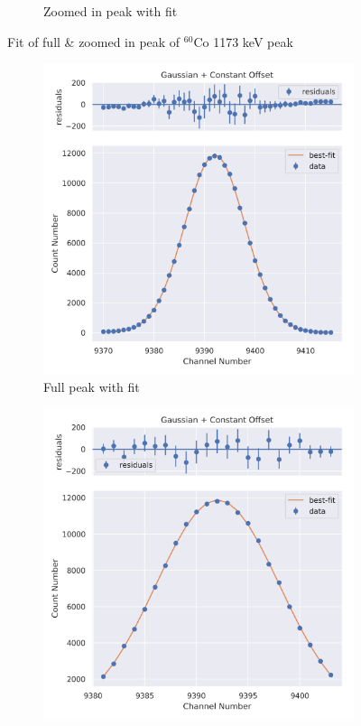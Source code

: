 \documentclass[11pt,a4paper]{article}
\newcommand{\element}[2]{$^{#2}\textrm{#1}$}
\begin{document}
\begin{figure}[H]
\begin{subfigure}{.5\linewidth}
    \caption{Zoomed in peak with fit}
  \end{subfigure}
  \caption{Fit of full \& zoomed in peak of \element{Co}{60} 1173 keV peak}
\end{figure}
\begin{figure}[H]
  \centering
  \begin{subfigure}{.5\linewidth}
    \centering
    \includegraphics[width=\linewidth]{./Images/Cobalt60/Gauss/Gauss_2_Full.png}
    \caption{Full peak with fit}
  \end{subfigure}%
  \begin{subfigure}{.5\linewidth}
    \centering
    \includegraphics[width=\linewidth]{./Images/Cobalt60/Gauss/Gauss_2_Zoom.png}

\end{subfigure}
\end{figure}
\end{document}
